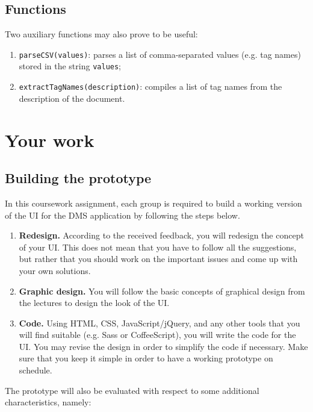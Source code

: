 \documentclass[a4,12pt]{article}
\begin{document}
\subsection*{Functions}

Two auxiliary functions may also prove to be useful:
\begin{enumerate}[- , noitemsep, topsep=-0.5em]
\item \verb+parseCSV(values)+: parses a list of comma-separated values (e.g. tag names) stored in the string \verb+values+;
\item \verb+extractTagNames(description)+: compiles a list of tag names from the description of the document.
\end{enumerate}

\section{Your work}

\subsection{Building the prototype}

In this coursework assignment, each group is required to build a working version of the UI for the DMS application by following the steps below.

\begin{enumerate}[noitemsep]
\item {\bf Redesign.} According to the received feedback, you will redesign the concept of your UI. This does not mean that you have to follow all the suggestions, but rather that you should work on the important issues and come up with your own solutions.
\item {\bf Graphic design.} You will follow the basic concepts of graphical design from the lectures to design the look of the UI.
\item {\bf Code.} Using HTML, CSS, JavaScript/jQuery, and any other tools that you will find suitable (e.g. Sass or CoffeeScript), you will write the code for the UI. You may revise the design in order to simplify the code if necessary. Make sure that you keep it simple in order to have a working prototype on schedule.
\end{enumerate}

\medskip

The prototype will also be evaluated with respect to some additional characteristics, namely:
\end{document}
